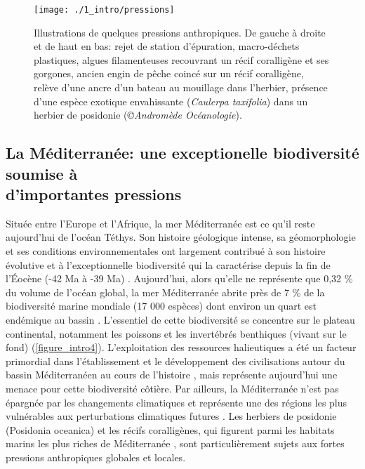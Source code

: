 \begin{figure}[H]
	\begin{center}
	\texttt{[image: ./1\_intro/pressions]}
		\caption[Illustrations de quelques pressions anthropiques]{Illustrations de quelques pressions anthropiques. De gauche à droite et de haut en bas: rejet de station d’épuration, macro-déchets plastiques, algues filamenteuses recouvrant un récif coralligène et ses gorgones, ancien engin de pêche coincé sur un récif coralligène, relève d’une ancre d’un bateau au mouillage dans l’herbier, présence d’une espèce exotique envahissante (\textit{Caulerpa taxifolia}) dans un herbier de posidonie (\textit{©Andromède Océanologie}).}
	\label{figure_intro3}
\end{center}
\end{figure}

\subsection[La Méditerranée: une exceptionelle biodiversité soumise à d’importantes pressions]{La Méditerranée: une exceptionelle biodiversité soumise à \\ d’importantes pressions}\label{intro.1.3}

Située entre l’Europe et l’Afrique, la mer Méditerranée est ce qu’il reste aujourd’hui de l’océan Téthys. Son histoire géologique intense, sa géomorphologie et ses conditions environnementales ont largement contribué à son histoire évolutive et à l’exceptionnelle biodiversité qui la caractérise depuis la fin de l’Éocène (-42 Ma à -39 Ma) \citep{boudouresque_marine_2004, renema_hopping_2008}. Aujourd’hui, alors qu’elle ne représente que 0,32 \% du volume de l’océan global, la mer Méditerranée abrite près de 7 \% de la biodiversité marine mondiale (17 000 espèces) \citep{coll_biodiversity_2010} dont environ un quart est endémique au bassin \citep{bianchi_rmesualtrsine_2000}. L’essentiel de cette biodiversité se concentre sur le plateau continental, notamment les poissons et les invertébrés benthiques (vivant sur le fond) \citep{coll_mediterranean_2012, katsanevakis_invading_2014} (\autoref{figure_intro4}). L’exploitation des ressources halieutiques a été un facteur primordial dans l’établissement et le développement des civilisations autour du bassin Méditerranéen au cours de l’histoire \citep{coll_biodiversity_2010}, mais représente aujourd’hui une menace pour cette biodiversité côtière. Par ailleurs, la Méditerranée n’est pas épargnée par les changements climatiques et représente une des régions les plus vulnérables aux perturbations climatiques futures \citep{giorgi_climate_2006, adloff_mediterranean_2015}. Les herbiers de posidonie (Posidonia oceanica) et les récifs coralligènes, qui figurent parmi les habitats marins les plus riches de Méditerranée \citep{boudouresque_marine_2004}, sont particulièrement sujets aux fortes pressions anthropiques globales et locales. 

